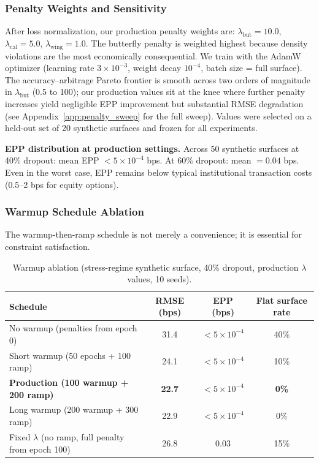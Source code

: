 \documentclass[11pt,a4paper]{article}
\begin{document}
\subsubsection{Penalty Weights and Sensitivity}

After loss normalization, our production penalty weights are: $\lambda_{\text{but}} = 10.0$, $\lambda_{\text{cal}} = 5.0$, $\lambda_{\text{wing}} = 1.0$. The butterfly penalty is weighted highest because density violations are the most economically consequential. We train with the AdamW optimizer (learning rate $3 \times 10^{-3}$, weight decay $10^{-4}$, batch size = full surface). The accuracy--arbitrage Pareto frontier is smooth across two orders of magnitude in $\lambda_{\text{but}}$ (0.5 to 100); our production values sit at the knee where further penalty increases yield negligible EPP improvement but substantial RMSE degradation (see Appendix~\ref{app:penalty_sweep} for the full sweep). Values were selected on a held-out set of 20 synthetic surfaces and frozen for all experiments.

\textbf{EPP distribution at production settings.} Across 50 synthetic surfaces at 40\% dropout: mean EPP $< 5 \times 10^{-4}$ bps. At 60\% dropout: mean $= 0.04$ bps. Even in the worst case, EPP remains below typical institutional transaction costs (0.5--2 bps for equity options).

\subsubsection{Warmup Schedule Ablation}

The warmup-then-ramp schedule is not merely a convenience; it is essential for constraint satisfaction.

\begin{table}[h]
\centering
\caption{Warmup ablation (stress-regime synthetic surface, 40\% dropout, production $\lambda$ values, 10 seeds).}
\label{tab:warmup_ablation}
\begin{tabular}{lccc}
\toprule
\textbf{Schedule} & \textbf{RMSE (bps)} & \textbf{EPP (bps)} & \textbf{Flat surface rate} \\
\midrule
No warmup (penalties from epoch 0) & 31.4 & $< 5 \times 10^{-4}$ & 40\% \\
Short warmup (50 epochs + 100 ramp) & 24.1 & $< 5 \times 10^{-4}$ & 10\% \\
\textbf{Production (100 warmup + 200 ramp)} & \textbf{22.7} & $< 5 \times 10^{-4}$ & \textbf{0\%} \\
Long warmup (200 warmup + 300 ramp) & 22.9 & $< 5 \times 10^{-4}$ & 0\% \\
Fixed $\lambda$ (no ramp, full penalty from epoch 100) & 26.8 & 0.03 & 15\% \\
\bottomrule
\end{tabular}
\end{table}
\end{document}
